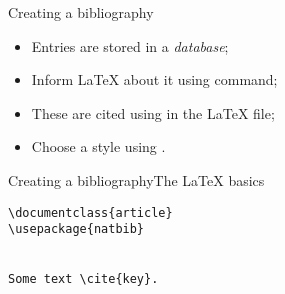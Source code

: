 \begin{frame}{Creating a bibliography}

  \begin{itemize}
    \item Entries are stored in a \emph{\BibTeX{} database};
    \item Inform \LaTeX{} about it using  command;
    \item These are cited using  in the \LaTeX{} file;
    \item Choose a style using .
  \end{itemize}
  
\end{frame}

\begin{frame}[fragile]{Creating a bibliography}{The \LaTeX{} basics}

\begin{verbatim}
\documentclass{article}
\usepackage{natbib}


Some text \cite{key}.


\end{verbatim}
  
\end{frame}

